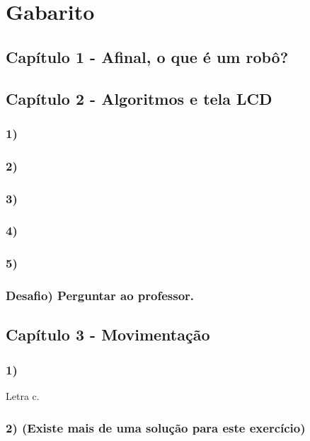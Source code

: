 \chapter*{Gabarito}

\section*{Capítulo 1 - Afinal, o que é um robô?}

\section*{Capítulo 2 - Algoritmos e tela LCD}

    \subsection*{1)}
    
    \subsection*{2)}
    
    \subsection*{3)}
    
    \subsection*{4)}
    
    \subsection*{5)}
    
    \subsection*{Desafio) Perguntar ao professor.}

\section*{Capítulo 3 - Movimentação}

    \subsection*{1)}
    Letra c.
    
    \subsection*{2) (Existe mais de uma solução para este exercício)}

